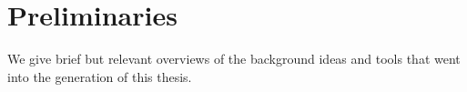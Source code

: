 \section{Preliminaries}

We give brief but relevant overviews of the background ideas and tools that went
into the generation of this thesis. 








